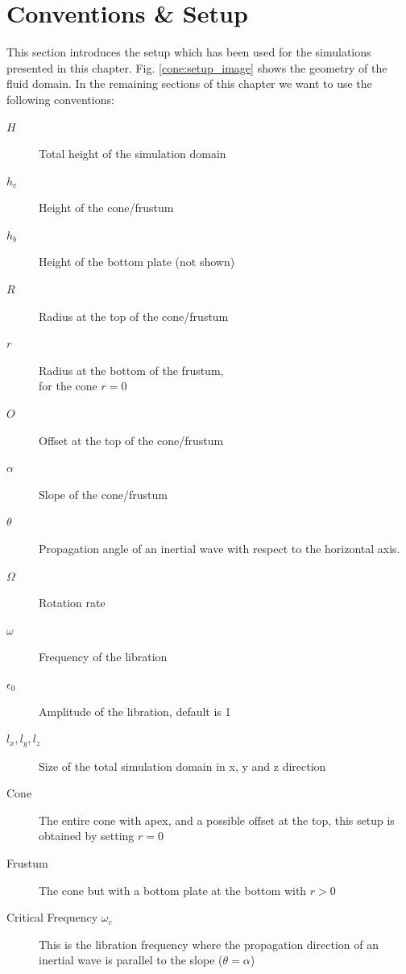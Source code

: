 \section{Conventions \& Setup}
\label{cone:convsetup}

This section introduces the setup which has been used for the simulations presented in this chapter.
Fig. \ref{cone:setup_image} shows the geometry of the fluid domain.
In the remaining sections of this chapter we want to use the following conventions:

\begin{multicols}{2}
\begin{description}
    \item[$H$]{Total height of the simulation domain}
    \item[$h_c$]{Height of the cone/frustum}
    \item[$h_b$]{Height of the bottom plate (not shown)}
    \item[$R$]{Radius at the top of the cone/frustum}
    \item[$r$]{Radius at the bottom  of the frustum,\\ for the cone $r=0$}
    \item[$O$]{Offset at the top of the cone/frustum}
    \item[$\alpha$]{Slope of the cone/frustum}
    \item[$\theta$]{Propagation angle of an inertial wave with respect to the horizontal axis.}
    \item[$\Omega$]{Rotation rate}
    \item[$\omega$]{Frequency of the libration}
    \item[$\epsilon_0$]{Amplitude of the libration, default is 1}%
    \item[$l_x, l_y, l_z$]{Size of the total simulation domain in x, y and z direction}
    \item[Cone] {The entire cone with apex, and a possible offset at the top, this setup is obtained by setting $r=0$}
    \item[Frustum]{The cone but with a bottom plate at the bottom with $r>0$}
    \item[Critical Frequency $\omega_c$]{This is the libration frequency where the propagation direction of an inertial wave is parallel to the slope ($\theta=\alpha$)}
\end{description}
\end{multicols}

